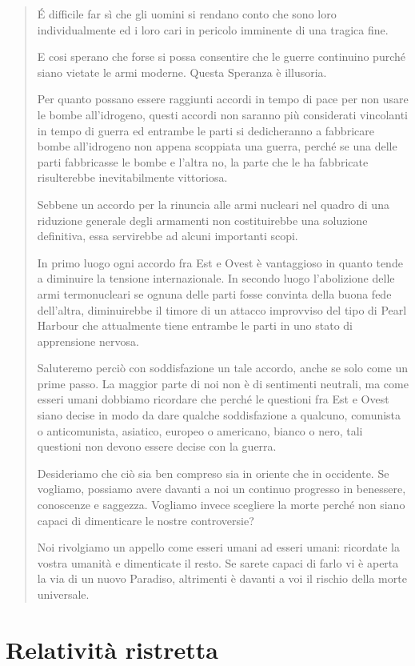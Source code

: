 \documentclass[a4paper, oneside]{article}
\newcounter{i}%
\newcounter{n}%
\newcounter{I}%
\begin{document}
\begin{quotation}
É difficile far sì che gli uomini si rendano conto che sono loro individualmente ed i loro cari in pericolo imminente di una tragica fine.

E cosi sperano che forse si possa consentire che le guerre continuino purché siano vietate le armi moderne. Questa Speranza è illusoria.   

Per quanto possano essere raggiunti accordi in tempo di pace per non usare le bombe all'idrogeno, questi accordi non saranno più considerati vincolanti in tempo di guerra ed entrambe le parti si dedicheranno a fabbricare bombe all'idrogeno non appena scoppiata una guerra, perché se una delle parti fabbricasse le bombe e l'altra no, la parte che le ha fabbricate risulterebbe inevitabilmente vittoriosa.

Sebbene un accordo per la rinuncia alle armi nucleari nel quadro di una riduzione generale degli armamenti non costituirebbe una soluzione definitiva, essa servirebbe ad alcuni importanti scopi.

In primo luogo ogni accordo fra Est e Ovest è vantaggioso in quanto tende a diminuire la tensione internazionale. In secondo luogo l'abolizione delle armi termonucleari se ognuna delle parti fosse convinta della buona fede dell'altra, diminuirebbe il timore di un attacco improvviso del tipo di Pearl Harbour che attualmente tiene entrambe le parti in uno stato di apprensione nervosa.

Saluteremo perciò con soddisfazione un tale accordo, anche se solo come un prime passo. La maggior parte di noi non è di sentimenti neutrali, ma come esseri umani dobbiamo ricordare che perché le questioni fra Est e Ovest siano decise in modo da dare qualche soddisfazione a qualcuno, comunista o anticomunista, asiatico, europeo o americano, bianco o nero, tali questioni non devono essere decise con la guerra.

Desideriamo che ciò sia ben compreso sia in oriente che in occidente. Se vogliamo, possiamo avere davanti a noi un continuo progresso in benessere, conoscenze e saggezza. Vogliamo invece scegliere la morte perché non siano capaci di dimenticare le nostre controversie?

Noi rivolgiamo un appello come esseri umani ad esseri umani: ricordate la vostra umanità e dimenticate il resto. Se sarete capaci di farlo vi è aperta la via di un nuovo Paradiso, altrimenti è davanti a voi il rischio della morte universale.
\end{quotation}

\section{Relatività ristretta}
\end{document}
